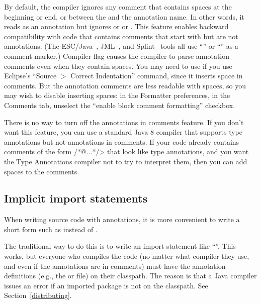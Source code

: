 By default, the compiler ignores any comment that contains spaces at the
beginning or end, or between the  and the annotation name.
In other words, it reads  as an annotation but ignores
 or  or .
This
feature enables backward compatibility with code that contains comments
that start with  but are not annotations.  (The
ESC/Java~\cite{FlanaganLLNSS02}, JML~\cite{LeavensBR2006:JML}, and
Splint~\cite{Evans96} tools all use ``'' or ``'' as a
comment marker.)
Compiler flag
 causes the compiler to parse annotation comments
even when they contain spaces.  You may need to use
 if you use Eclipse's ``Source $>$ Correct
Indentation'' command, since it inserts space in comments.  But the
annotation comments are less readable with spaces, so you may wish to disable
inserting spaces:  in the Formatter preferences, in the Comments tab,
unselect the ``enable block comment formatting'' checkbox.

There is no way to turn off the annotations in comments feature.  If you
don't want this feature, you can use a standard Java 8 compiler that
supports type annotations but not annotations in comments.  If your code
already contains comments of the form \</*@...*/> that look like type
annotations, and you want the Type Annotations compiler not to try to
interpret them, then you can add spaces to the comments.


\subsection{Implicit import statements\label{implicit-import-statements}}

When writing source code with annotations, it is more convenient to write a
short form such as  instead of
.

The traditional way to do this is to write an import statement like
``''.  This works, but everyone who
compiles the code (no matter what compiler they use, and even if the
annotations are in comments) must have the annotation definitions (e.g.,
the  or  file) on their
classpath.  The reason is that a Java compiler issues an error if an
imported package is not on the classpath.  See Section~\ref{distributing}.

\label{jsr308_imports}

